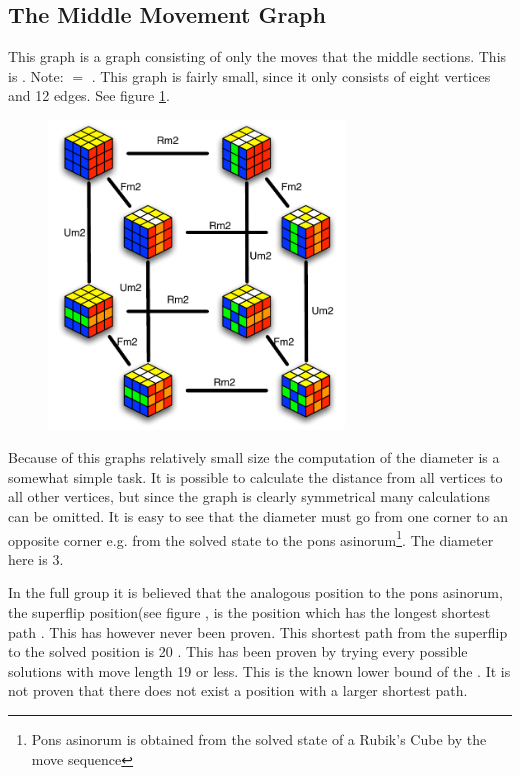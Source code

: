 \subsection{The Middle Movement Graph}
\label{sub:middleMoveGraph}
This graph is a \rubik{} graph consisting of only the moves that \twist{} the middle sections. 
This is . Note:  $=$ .  This graph is fairly small, since it only consists of eight vertices and 12 edges. See figure \ref{fig:graphMiddleSlice2}. \cite[pp. 158-167]{Rubik87}

\begin{figure}[bht!]
	\centering
		\includegraphics[width = 0.7\textwidth]{input/pics/graphMiddleSlice2.pdf}
	\caption{}
	\label{fig:graphMiddleSlice2}
\end{figure}

Because of this graphs relatively small size the computation of the diameter is a somewhat simple task. It is possible to calculate the distance from all vertices to all other vertices, but since the graph is clearly symmetrical many calculations can be omitted. It is easy to see that the diameter must go from one corner to an opposite corner e.g. from the solved state to the pons asinorum\footnote{Pons asinorum is obtained from the solved state of a Rubik's Cube by the move sequence }. The diameter here is 3. 

In the full \rubik{} group it is believed that the analogous position to the pons asinorum, the superflip position(see figure , is the position which has the longest shortest path \cite{speedsolving.wiki}. This has however never been proven. This shortest path from the superflip to the solved position is 20 \cite{rokicki09}. This has been proven by trying every possible solutions with move length 19 or less. This is the known lower bound of the \cube{}. It is not proven that there does not exist a position with a larger shortest path. 

